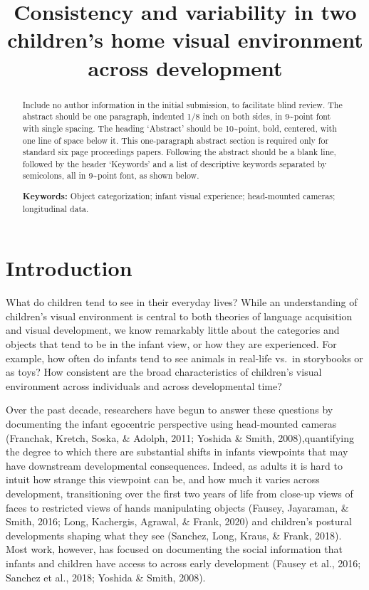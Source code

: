 \documentclass[10pt, letterpaper]{article}
\title{Consistency and variability in two children's home visual environment
across development}
\author{}
\begin{document}
\maketitle

\begin{abstract}
Include no author information in the initial submission, to facilitate
blind review. The abstract should be one paragraph, indented 1/8 inch on
both sides, in 9\textasciitilde point font with single spacing. The
heading `Abstract' should be 10\textasciitilde point, bold, centered,
with one line of space below it. This one-paragraph abstract section is
required only for standard six page proceedings papers. Following the
abstract should be a blank line, followed by the header `Keywords' and a
list of descriptive keywords separated by semicolons, all in
9\textasciitilde point font, as shown below.

\textbf{Keywords:}
Object categorization; infant visual experience; head-mounted cameras;
longitudinal data.
\end{abstract}

\hypertarget{introduction}{%
\section{Introduction}\label{introduction}}

What do children tend to see in their everyday lives? While an
understanding of children's visual environment is central to both
theories of language acquisition and visual development, we know
remarkably little about the categories and objects that tend to be in
the infant view, or how they are experienced. For example, how often do
infants tend to see animals in real-life vs.~in storybooks or as toys?
How consistent are the broad characteristics of children's visual
environment across individuals and across developmental time?

Over the past decade, researchers have begun to answer these questions
by documenting the infant egocentric perspective using head-mounted
cameras (Franchak, Kretch, Soska, \& Adolph, 2011; Yoshida \& Smith,
2008),quantifying the degree to which there are substantial shifts in
infants viewpoints that may have downstream developmental consequences.
Indeed, as adults it is hard to intuit how strange this viewpoint can
be, and how much it varies across development, transitioning over the
first two years of life from close-up views of faces to restricted views
of hands manipulating objects (Fausey, Jayaraman, \& Smith, 2016; Long,
Kachergis, Agrawal, \& Frank, 2020) and children's postural developments
shaping what they see (Sanchez, Long, Kraus, \& Frank, 2018). Most work,
however, has focused on documenting the social information that infants
and children have access to across early development (Fausey et al.,
2016; Sanchez et al., 2018; Yoshida \& Smith, 2008).
\end{document}
